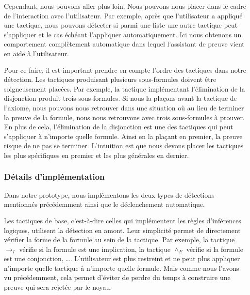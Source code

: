 \documentclass[french,titlepage]{article}
\begin{document}
Cependant, nous pouvons aller plus loin. Nous pouvons nous placer dans le cadre de l'interaction avec l'utilisateur. Par exemple, après que l'utilisateur a appliqué une tactique, nous pouvons détecter si parmi une liste une autre tactique peut s'appliquer et le cas échéant l'appliquer automatiquement. Ici nous obtenons un comportement complètement automatique dans lequel l'assistant de preuve vient en aide à l'utilisateur.

Pour ce faire, il est important prendre en compte l'ordre des tactiques dans notre détection. Les tactiques produisant plusieurs sous-formules doivent être soigneusement placées. Par exemple, la tactique implémentant l'élimination de la disjonction produit trois sous-formules. Si nous la plaçons avant la tactique de l'axiome, nous pouvons nous retrouver dans une situation où au lieu de terminer la preuve de la formule, nous nous retrouvons avec trois sous-formules à prouver. En plus de cela, l'élimination de la disjonction est une des tactiques qui peut s'appliquer à n'importe quelle formule. Ainsi en la plaçant en premier, la preuve risque de ne pas se terminer. L'intuition est que nous devons placer les tactiques les plus spécifiques en premier et les plus générales en dernier.

\subsubsection{Détails d'implémentation} \label{realisation:detection_declenchement:details_implementation}
Dans notre prototype, nous implémentons les deux types de détections mentionnés précédemment ainsi que le déclenchement automatique.

Les tactiques de base, c'est-à-dire celles qui implémentent les règles d'inférences logiques, utilisent la détection en amont. Leur simplicité permet de directement vérifier la forme de la formule au sein de la tactique. Par exemple, la tactique $\to_I$ vérifie si la formule est une implication, la tactique $\land_E$ vérifie si la formule est une conjonction, \dots. L'utilisateur est plus restreint et ne peut plus appliquer n'importe quelle tactique à n'importe quelle formule. Mais comme nous l'avons vu précédemment, cela permet d'éviter de perdre du temps à construire une preuve qui sera rejetée par le noyau.
\end{document}
